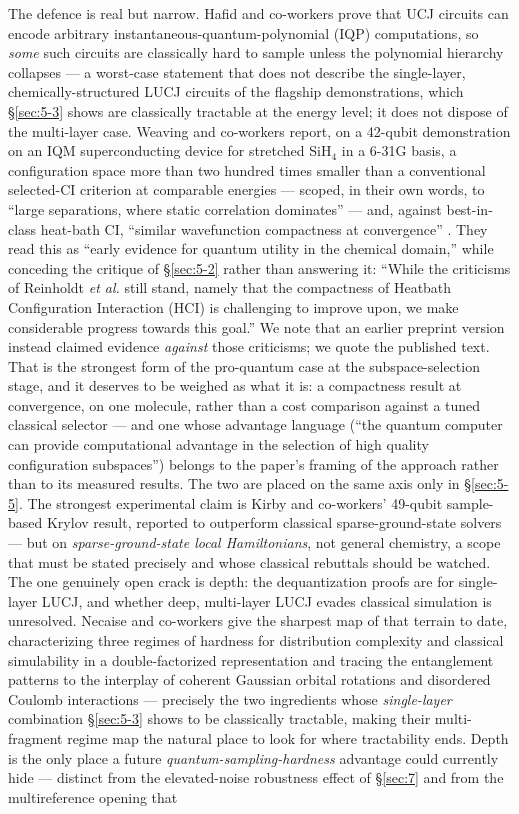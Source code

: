 \documentclass[onecolumn,a4paper]{quantumarticle}
\begin{document}
The defence is real but narrow. Hafid and co-workers prove that UCJ circuits can encode arbitrary instantaneous-quantum-polynomial (IQP) computations, so \emph{some} such circuits are classically hard to sample unless the polynomial hierarchy collapses \cite{hafid2025} --- a worst-case statement that does not describe the single-layer, chemically-structured LUCJ circuits of the flagship demonstrations, which \S\ref{sec:5-3} shows are classically tractable at the energy level; it does not dispose of the multi-layer case. Weaving and co-workers report, on a 42-qubit demonstration on an IQM superconducting device for stretched SiH$_4$ in a 6-31G basis, a configuration space more than two hundred times smaller than a conventional selected-CI criterion at comparable energies --- scoped, in their own words, to ``large separations, where static correlation dominates'' --- and, against best-in-class heat-bath CI, ``similar wavefunction compactness at convergence'' \cite{weaving2025}. They read this as ``early evidence for quantum utility in the chemical domain,'' while conceding the critique of \S\ref{sec:5-2} rather than answering it: ``While the criticisms of Reinholdt \emph{et al.} still stand, namely that the compactness of Heatbath Configuration Interaction (HCI) is challenging to improve upon, we make considerable progress towards this goal.'' We note that an earlier preprint version instead claimed evidence \emph{against} those criticisms; we quote the published text. That is the strongest form of the pro-quantum case at the subspace-selection stage, and it deserves to be weighed as what it is: a compactness result at convergence, on one molecule, rather than a cost comparison against a tuned classical selector --- and one whose advantage language (``the quantum computer can provide computational advantage in the selection of high quality configuration subspaces'') belongs to the paper's framing of the approach rather than to its measured results. The two are placed on the same axis only in \S\ref{sec:5-5}. The strongest experimental claim is Kirby and co-workers' 49-qubit sample-based Krylov result, reported to outperform classical sparse-ground-state solvers \cite{kirby2026} --- but on \emph{sparse-ground-state local Hamiltonians}, not general chemistry, a scope that must be stated precisely and whose classical rebuttals should be watched. The one genuinely open crack is depth: the dequantization proofs are for single-layer LUCJ, and whether deep, multi-layer LUCJ evades classical simulation is unresolved. Necaise and co-workers give the sharpest map of that terrain to date, characterizing three regimes of hardness for distribution complexity and classical simulability in a double-factorized representation and tracing the entanglement patterns to the interplay of coherent Gaussian orbital rotations and disordered Coulomb interactions \cite{necaise2026} --- precisely the two ingredients whose \emph{single-layer} combination \S\ref{sec:5-3} shows to be classically tractable, making their multi-fragment regime map the natural place to look for where tractability ends. Depth is the only place a future \emph{quantum-sampling-hardness} advantage could currently hide --- distinct from the elevated-noise robustness effect of \S\ref{sec:7}  and from the multireference opening that 
\end{document}
